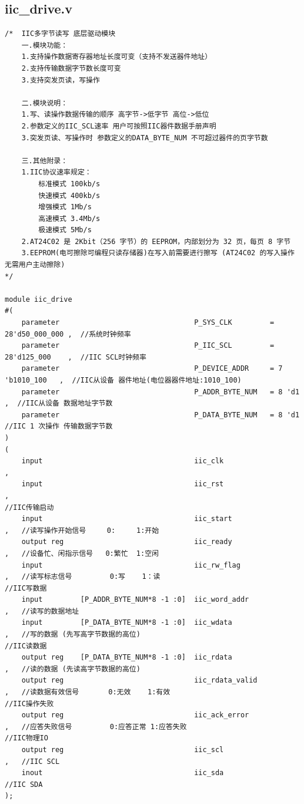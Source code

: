 \documentclass[a4paper,10pt]{article}
\begin{document}
\subsection{iic_drive.v}
\begin{lstlisting}[caption=iic_drive.v]
/*  IIC多字节读写 底层驱动模块
    一.模块功能：
    1.支持操作数据寄存器地址长度可变（支持不发送器件地址） 
    2.支持传输数据字节数长度可变    
    3.支持突发页读，写操作

    二.模块说明：
    1.写、读操作数据传输的顺序 高字节->低字节 高位->低位
    2.参数定义的IIC_SCL速率 用户可按照IIC器件数据手册声明
    3.突发页读、写操作时 参数定义的DATA_BYTE_NUM 不可超过器件的页字节数

    三.其他附录：
    1.IIC协议速率规定：
        标准模式 100kb/s
        快速模式 400kb/s
        增强模式 1Mb/s
        高速模式 3.4Mb/s
        极速模式 5Mb/s
    2.AT24C02 是 2Kbit（256 字节）的 EEPROM，内部划分为 32 页，每页 8 字节
    3.EEPROM(电可擦除可编程只读存储器)在写入前需要进行擦写 (AT24C02 的写入操作无需用户主动擦除)
*/

module iic_drive
#(
    parameter                                P_SYS_CLK         = 28'd50_000_000 ,  //系统时钟频率
    parameter                                P_IIC_SCL         = 28'd125_000    ,  //IIC SCL时钟频率 
    parameter                                P_DEVICE_ADDR     = 7 'b1010_100   ,  //IIC从设备 器件地址(电位器器件地址:1010_100)
    parameter                                P_ADDR_BYTE_NUM   = 8 'd1          ,  //IIC从设备 数据地址字节数
    parameter                                P_DATA_BYTE_NUM   = 8 'd1              //IIC 1 次操作 传输数据字节数
)
(
    input                                    iic_clk                            ,
    input                                    iic_rst                            ,
//IIC传输启动
    input                                    iic_start                          ,   //读写操作开始信号     0:     1:开始
    output reg                               iic_ready                          ,   //设备忙、闲指示信号   0:繁忙  1:空闲
    input                                    iic_rw_flag                        ,   //读写标志信号         0:写    1：读 
//IIC写数据 
    input         [P_ADDR_BYTE_NUM*8 -1 :0]  iic_word_addr                      ,   //读写的数据地址       
    input         [P_DATA_BYTE_NUM*8 -1 :0]  iic_wdata                          ,   //写的数据 (先写高字节数据的高位)   
//IIC读数据 
    output reg    [P_DATA_BYTE_NUM*8 -1 :0]  iic_rdata                          ,   //读的数据 (先读高字节数据的高位) 
    output reg                               iic_rdata_valid                    ,   //读数据有效信号       0:无效    1:有效
//IIC操作失败   
    output reg                               iic_ack_error                      ,   //应答失败信号         0:应答正常 1:应答失败
//IIC物理IO 
    output reg                               iic_scl                            ,   //IIC SCL 
    inout                                    iic_sda                                //IIC SDA
);


\end{lstlisting}
\end{document}
